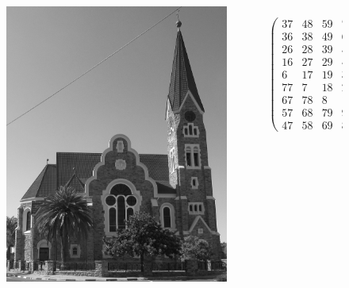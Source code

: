 \documentclass{beamer}
\begin{document}
\begin{frame}
\begin{figure}
    \begin{columns}
	\begin{column}{0.45\textwidth}
		\begin{center}
		\includegraphics[width=0.9\textwidth]{../testimage.jpg}
		\end{center}
	\end{column}
	\begin{column}{0.55\textwidth}
		\scriptsize{
		\begin{equation*}
    \begin{pmatrix}
      37 & 48 & 59 & 70 & 81 & 2 & 13 & 24 & 35 \\
      36 & 38 & 49 & 60 & 71 & 73 & 3 & 14 & 25 \\
      26 & 28 & 39 & 50 & 61 & 72 & 74 & 4 & 15 \\
      16 & 27 & 29 & 40 & 51 & 62 & 64 & 75 & 5 \\
      6 & 17 & 19 & 30 & 41 & 52 & 63 & 65 & 76 \\
      77 & 7 & 18 & 20 & 31 & 42 & 53 & 55 & 66 \\
      67 & 78 & 8 & 10 & 21 & 32 & 43 & 54 & 56 \\
      57 & 68 & 79 & 9 & 11 & 22 & 33 & 44 & 46 \\
      47 & 58 & 69 & 80 & 1 & 12 & 23 & 34 & 45
    \end{pmatrix}
		\end{equation*}
		}
	\end{column}
	\end{columns}
\end{figure}
\end{frame}
\end{document}
